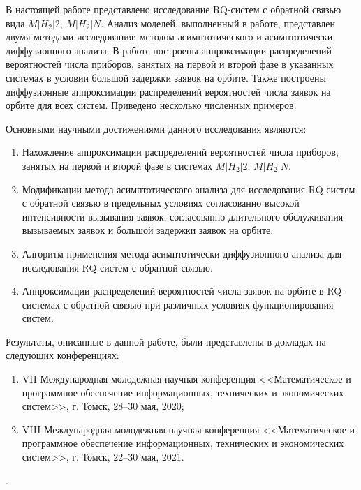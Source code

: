 В настоящей работе представлено исследование RQ-систем с обратной связью вида $M|H_{2}|2$, $M|H_{2}|N$. Анализ моделей, выполненный в работе, представлен двумя методами исследования: методом асимптотического и асимптотически диффузионного анализа. В работе построены аппроксимации распределений вероятностей числа приборов, занятых на первой и второй фазе в указанных системах в условии большой задержки заявок на орбите. Также построены диффузионные аппроксимации распределений вероятностей числа заявок на орбите для всех систем. Приведено несколько численных примеров. 

Основными научными достижениями данного исследования являются:
\begin{enumerate} 
	\item Нахождение аппроксимации распределений вероятностей числа приборов, занятых на первой и второй фазе в системах $M|H_{2}|2$, $M|H_{2}|N$. 
	\item Модификации метода асимптотического анализа для исследования RQ-систем с обратной связью в предельных условиях согласованно высокой интенсивности вызывания заявок, согласованно длительного обслуживания вызываемых заявок и большой задержки заявок на орбите.
	\item Алгоритм применения метода асимптотически-диффузионного анализа для исследования RQ-систем с обратной связью.
	\item Аппроксимации распределений вероятностей числа заявок на орбите в RQ-системах с обратной связью при различных условиях функционирования систем.
\end{enumerate}

Результаты, описанные в данной работе, были представлены в докладах на следующих конференциях:
\begin{enumerate} 
	\item VII Международная молодежная научная конференция <<Математическое и программное обеспечение информационных, технических и экономических систем>>, г. Томск, 28--30 мая, 2020;
	\item VIII Международная молодежная научная конференция <<Математическое и программное обеспечение информационных, технических и экономических систем>>, г. Томск, 22--30 мая, 2021.
\end{enumerate}.
